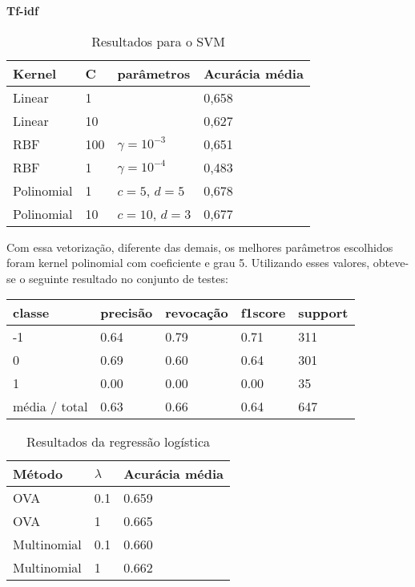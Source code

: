 \textbf{Tf-idf}

\begin{table}[H]
	\centering
	\caption{Resultados para o SVM}
	\begin{tabular}{l l l l}
		\hline
		Kernel & C & parâmetros & Acurácia média \\
		\hline
		Linear & 1 & & 0,658 \\
		\hline
		Linear & 10 & & 0,627 \\
		\hline
		RBF & 100 & $\gamma = 10^{-3}$ & 0,651 \\
		\hline
		RBF & 1 & $\gamma = 10^{-4}$ & 0,483 \\
		\hline
		Polinomial & 1 & $c = 5$, $d = 5$ & 0,678 \\
		\hline
		Polinomial & 10 & $c = 10$, $d = 3$ & 0,677 \\
		\hline
	\end{tabular}
\end{table}

Com essa vetorização, diferente das demais, os melhores parâmetros escolhidos foram kernel polinomial
com coeficiente e grau 5. Utilizando esses valores, obteve-se o seguinte resultado no conjunto de
testes:

\begin{table}[H]
	\centering
		\begin{tabular}{l | l | l | l | l}
		\hline
		classe  	&	precisão  &  revocação &  f1\-score &  support \\
		\hline
		 -1    &   0.64   &   0.79   &   0.71   &    311 \\
		 \hline
          0    &   0.69   &   0.60  &    0.64    &   301 \\
          \hline
          1   &    0.00   &   0.00   &   0.00    &    35 \\
          \hline
		média / total   &    0.63   &   0.66   &   0.64   &    647 \\
		\hline
	\end{tabular}
\end{table}

\begin{table}[H]
	\centering
	\caption{Resultados da regressão logística}
	\begin{tabular}{l l l}
		\hline
		Método & $\lambda$ & Acurácia média \\
		\hline
		OVA & 0.1 & 0.659 \\
		\hline
		OVA & 1 & 0.665 \\
		\hline
		Multinomial & 0.1 & 0.660 \\
		\hline
		Multinomial & 1 & 0.662 \\
		\hline
	\end{tabular}
\end{table}

